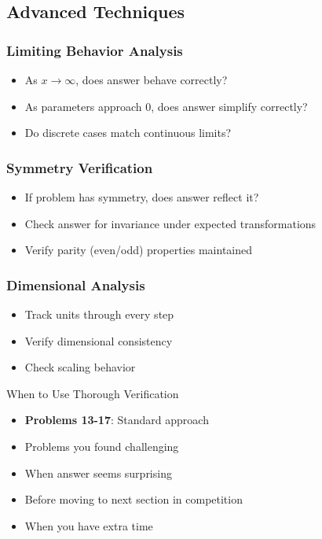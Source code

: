 \documentclass{article}
\newcommand{\problemrange}[1]{\textbf{Problems #1}}
\begin{document}
\subsection{Advanced Techniques}

\subsubsection{Limiting Behavior Analysis}
\begin{itemize}
\item As $x \to \infty$, does answer behave correctly?
\item As parameters approach 0, does answer simplify correctly?
\item Do discrete cases match continuous limits?
\end{itemize}

\subsubsection{Symmetry Verification}
\begin{itemize}
\item If problem has symmetry, does answer reflect it?
\item Check answer for invariance under expected transformations
\item Verify parity (even/odd) properties maintained
\end{itemize}

\subsubsection{Dimensional Analysis}
\begin{itemize}
\item Track units through every step
\item Verify dimensional consistency
\item Check scaling behavior
\end{itemize}

\begin{contextbox}{When to Use Thorough Verification}
\begin{itemize}[nosep]
\item \problemrange{13-17}: Standard approach
\item Problems you found challenging
\item When answer seems surprising
\item Before moving to next section in competition
\item When you have extra time
\end{itemize}
\end{contextbox}
\end{document}
